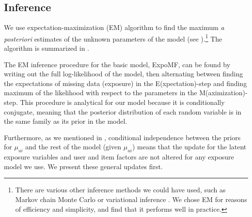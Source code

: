 

\subsection{Inference}
\label{sec:inference}
We use expectation-maximization (EM) algorithm to find the maximum \emph{a posteriori} estimates of the unknown parameters of the model (see ).\footnote{There are various other inference methods we could have used, such as Markov chain Monte Carlo \citep{neal1993probabilistic,robert2013monte} or variational inference \citep{jordan1999introduction,wainwright2008graphical}. We chose EM for reasons of efficiency and simplicity, and find that it performs well in practice.} The algorithm is summarized in .

The EM inference procedure for the basic model, ExpoMF, 
can be found by writing out the full log-likelihood of the model, 
then alternating between finding the expectations of missing data (exposure)
in the E(xpectation)-step and finding maximum of the likelihood with respect to the parameters in the M(aximization)-step. 
This procedure is analytical for our model because it is conditionally conjugate, 
meaning that the posterior distribution of each random variable 
is in the same family as its prior in the model. 

Furthermore, as we mentioned in , conditional independence 
between the priors for $\mu_{ui}$ and the rest of the model (given $\mu_{ui}$) 
means that the update for the latent exposure variables and user and item factors are not altered for any exposure model we use. We present these general updates first.


